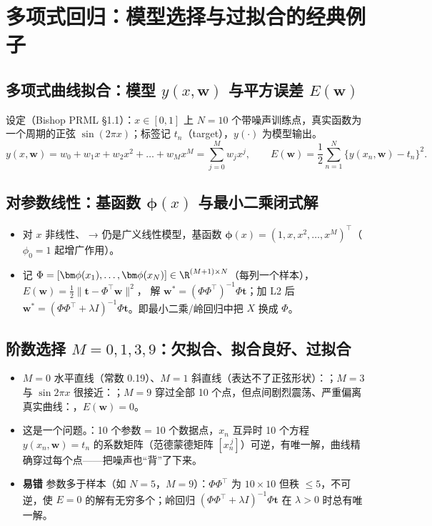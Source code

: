 \section{多项式回归：模型选择与过拟合的经典例子}

\subsection{多项式曲线拟合：模型 \texorpdfstring{$y(x,\bm w)$}{y(x,w)} 与平方误差 \texorpdfstring{$E(\bm w)$}{E(w)}}
设定（Bishop PRML §1.1）：$x\in[0,1]$ 上 $N=10$ 个带噪声训练点，真实函数为一个周期的正弦 $\sin(2\pi x)$；标签记 $t_n$（target），$y(\cdot)$ 为模型输出。
\[
y(x,\bm w)=w_0+w_1x+w_2x^2+\dots+w_Mx^M=\sum_{j=0}^{M}w_jx^j,\qquad
E(\bm w)=\frac12\sum_{n=1}^{N}\bigl\{y(x_n,\bm w)-t_n\bigr\}^2 .
\]

\subsection{对参数线性：基函数 \texorpdfstring{$\bm\phi(x)$}{phi(x)} 与最小二乘闭式解}
\begin{itemize}
\item 对 $x$ 非线性、 → 仍是广义线性模型，基函数 $\bm\phi(x)=(1,x,x^2,\dots,x^M)^\top$（$\phi_0=1$ 起增广作用）。
\item 记 $\Phi=[\bm\phi(x_1),\dots,\bm\phi(x_N)]\in\R^{(M+1)\times N}$（每列一个样本），$E(\bm w)=\frac12\|\bm t-\Phi^\top\bm w\|^2$，
解 $\bm w^*=(\Phi\Phi^\top)^{-1}\Phi\bm t$；加 L2 后 $\bm w^*=(\Phi\Phi^\top+\lambda I)^{-1}\Phi\bm t$。即最小二乘/岭回归中把 $X$ 换成 $\Phi$。
\end{itemize}

\subsection{阶数选择 \texorpdfstring{$M=0,1,3,9$}{M=0,1,3,9}：欠拟合、拟合良好、过拟合}
\begin{itemize}
\item $M=0$ 水平直线（常数 0.19）、$M=1$ 斜直线（表达不了正弦形状）：；$M=3$ 与 $\sin2\pi x$ 很接近：；$M=9$ 穿过全部 10 个点，但点间剧烈震荡、严重偏离真实曲线：，$E(\bm w)=0$。
\item 这是一个问题。：10 个参数 = 10 个数据点，$x_n$ 互异时 10 个方程 $y(x_n,\bm w)=t_n$ 的系数矩阵（范德蒙德矩阵 $[x_n^{\,j}]$）可逆，有唯一解，曲线精确穿过每个点——把噪声也“背”了下来。
\item \textbf{易错} 参数多于样本（如 $N=5$，$M=9$）：$\Phi\Phi^\top$ 为 $10\times10$ 但秩 $\le5$，不可逆，使 $E=0$ 的解有无穷多个；岭回归 $(\Phi\Phi^\top+\lambda I)^{-1}\Phi\bm t$ 在 $\lambda>0$ 时总有唯一解。
\end{itemize}

